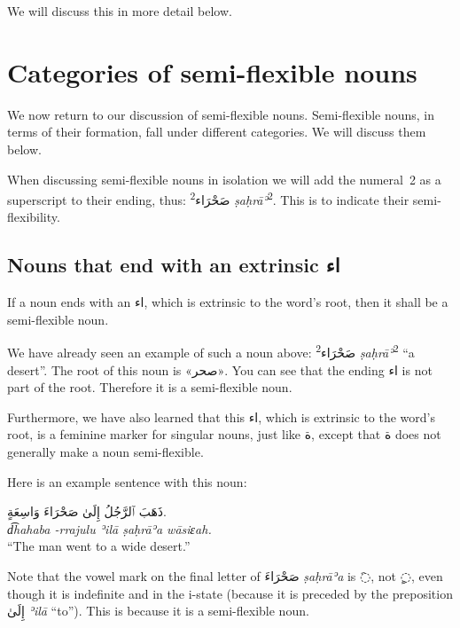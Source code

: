 \documentclass[
  10pt,
]{book}
\begin{document}
We will discuss this in more detail below.

\section{Categories of semi-flexible nouns}\label{categories-of-semi-flexible-nouns}

We now return to our discussion of semi-flexible nouns. Semi-flexible nouns, in terms of their formation, fall under different categories. We will discuss them below.

When discussing semi-flexible nouns in isolation we will add the numeral~2 as a superscript to their ending, thus:
\textsuperscript{2}\foreignlanguage{arabic}{صَحْرَاء} \emph{ṣaḥrāʾ}\textsuperscript{2}. This is to indicate their semi-flexibility.

\subsection{\texorpdfstring{Nouns that end with an extrinsic \foreignlanguage{arabic}{اء}}{Nouns that end with an extrinsic اء}}\label{nouns-that-end-with-an-extrinsic-ux627ux621}

If a noun ends with an \foreignlanguage{arabic}{اء}, which is extrinsic to the word's root, then it shall be a semi-flexible noun.

We have already seen an example of such a noun above: \textsuperscript{2}\foreignlanguage{arabic}{صَحْرَاء} \emph{ṣaḥrāʾ}\textsuperscript{2} \enquote{a desert}. The root of this noun is \foreignlanguage{arabic}{«صحر»}. You can see that the ending \foreignlanguage{arabic}{اء} is not part of the root. Therefore it is a semi-flexible noun.

Furthermore, we have also learned that this \foreignlanguage{arabic}{اء}, which is extrinsic to the word's root, is a feminine marker for singular nouns, just like \foreignlanguage{arabic}{ة}, except that \foreignlanguage{arabic}{ة} does not generally make a noun semi-flexible.

Here is an example sentence with this noun:

\foreignlanguage{arabic}{ذَهَبَ ٱلرَّجُلُ إِلَىٰ صَحْرَاءَ وَاسِعَةٍ.}\\
\emph{d͡hahaba -rrajulu ʾilā ṣaḥrāʾa wāsiɛah.}\\
\enquote{The man went to a wide desert.}

Note that the vowel mark on the final letter of \foreignlanguage{arabic}{صَحْرَاءَ} \emph{ṣaḥrāʾa} is \foreignlanguage{arabic}{◌َ}, not \foreignlanguage{arabic}{◌ٍ}, even though it is indefinite and in the i-state (because it is preceded by the preposition \foreignlanguage{arabic}{إِلَىٰ} \emph{ʾilā} \enquote{to}). This is because it is a semi-flexible noun.
\end{document}
